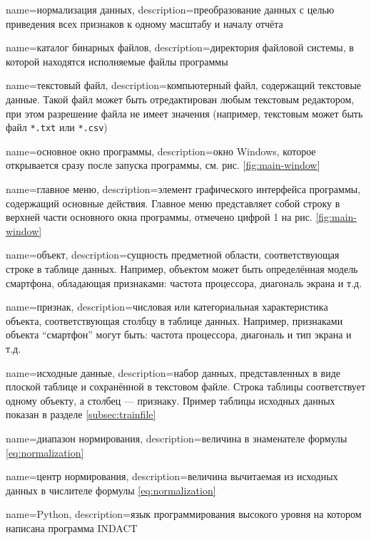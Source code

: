 {
	name=нормализация данных,
	description={преобразование данных с целью приведения всех признаков к одному масштабу и началу отчёта}
}

{
	name=каталог бинарных файлов,
	description={директория файловой системы, в которой находятся исполняемые файлы программы}
}

{
	name=текстовый файл,
	description={компьютерный файл, содержащий текстовые данные. Такой файл может быть отредактирован любым текстовым редактором, при этом разрешение файла не имеет значения (например, текстовым может быть файл \texttt{*.txt} или \texttt{*.csv}) }
}

{
	name=основное окно программы,
	description={окно Windows, которое открывается сразу после запуска программы, см. рис. \ref{fig:main-window}}
}

{
	name=главное меню,
	description={элемент графического интерфейса программы, содержащий основные действия. Главное меню представляет собой строку в верхней части основного окна программы, отмечено цифрой 1 на рис. \ref{fig:main-window}}
}

{
	name=объект,
	description={сущность предметной области, соответствующая строке в таблице данных. Например, объектом может быть определённая модель смартфона, обладающая признаками: частота процессора, диагональ экрана и т.д.}
}


{
	name=признак,
	description={числовая или категориальная характеристика объекта, соответствующая столбцу в таблице данных. Например, признаками объекта ``смартфон'' могут быть:  частота процессора, диагональ и тип экрана и т.д.}
}


{
	name=исходные данные,
	description={набор данных, представленных в виде плоской таблице и сохранённой в текстовом файле. Строка таблицы соответствует одному объекту, а столбец --- признаку. Пример таблицы исходных данных показан в разделе \ref{subsec:trainfile}}
}

{
	name=диапазон нормирования,
	description={величина в знаменателе формулы \ref{eq:normalization}}
}

{
	name=центр нормирования,
	description={величина вычитаемая из исходных данных в числителе формулы \ref{eq:normalization}}
}

{
	name=Python,
	description={язык программирования высокого уровня на котором написана программа INDACT}
}


